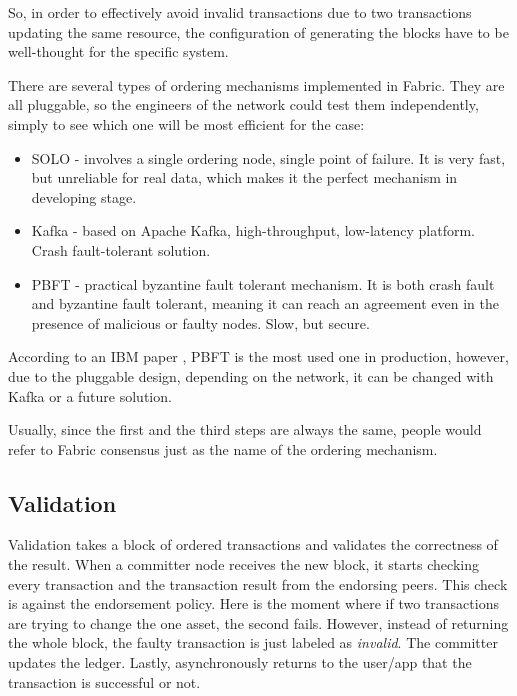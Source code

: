 \documentclass[a4paper,11pt]{report}
\begin{document}
	So, in order to effectively avoid invalid transactions due to two transactions updating the same resource, the configuration of generating the blocks have to be well-thought for the specific system. 
	
There are several types of ordering mechanisms implemented in Fabric. They are all pluggable, so the engineers of the network could test them independently, simply to see which one will be most efficient for the case: 
\begin{itemize}
\item SOLO - involves a single ordering node, single point of failure. It is very fast, but unreliable for real data, which makes it the perfect mechanism in developing stage. 
\item Kafka - based on Apache Kafka, high-throughput, low-latency platform. Crash fault-tolerant solution. 
\item PBFT - practical byzantine fault tolerant mechanism. It is both crash fault and byzantine fault tolerant, meaning it can reach an agreement even in the presence of malicious or faulty nodes. Slow, but secure.
\end{itemize}
According to an IBM paper \cite{cachin2016architecture}, PBFT is the most used one in production, however, due to the pluggable design, depending on the network, it can be changed with Kafka or a future solution.

Usually, since the first and the third steps are always the same, people would refer to Fabric consensus just as the name of the ordering mechanism.

\subsection{Validation}

Validation takes a block of ordered transactions and validates the correctness of the result. 
When a committer node receives the new block, it starts checking every transaction and the transaction result from the endorsing peers. This check is against the endorsement policy. Here is the moment where if two transactions are trying to change the one asset, the second fails. However, instead of returning the whole block, the faulty transaction is just labeled as \textit{invalid}. The committer updates the ledger. Lastly, asynchronously returns to the user/app that the transaction is successful or not.
\end{document}
